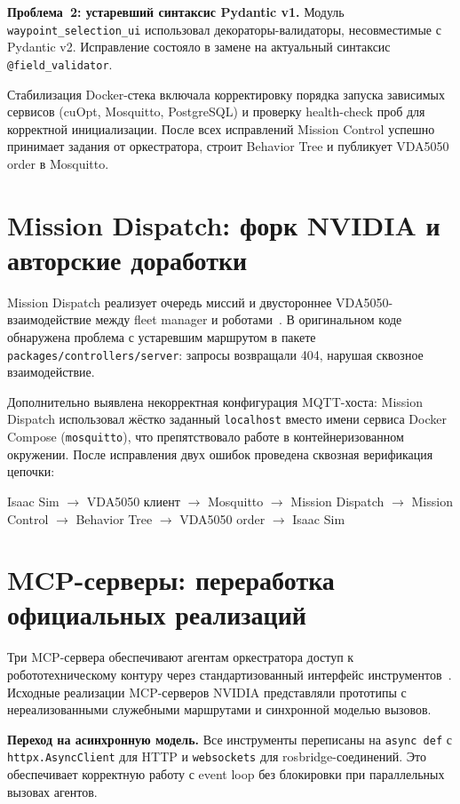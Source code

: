 \documentclass[14pt,a4paper]{extreport}
\begin{document}
\textbf{Проблема~2: устаревший синтаксис Pydantic v1.} Модуль \texttt{waypoint\_selection\_ui} использовал декораторы-валидаторы, несовместимые с Pydantic v2. Исправление состояло в замене на актуальный синтаксис \texttt{@field\_validator}.

Стабилизация Docker-стека включала корректировку порядка запуска зависимых сервисов (cuOpt, Mosquitto, PostgreSQL) и проверку health-check проб для корректной инициализации. После всех исправлений Mission Control успешно принимает задания от оркестратора, строит Behavior Tree и публикует VDA5050 order в Mosquitto.

\section{Mission Dispatch: форк NVIDIA и авторские доработки}

Mission Dispatch реализует очередь миссий и двустороннее VDA5050-взаимодействие между fleet manager и роботами~\cite{missiondispatch}. В оригинальном коде обнаружена проблема с устаревшим маршрутом в пакете \texttt{packages/controllers/server}: запросы возвращали 404, нарушая сквозное взаимодействие.

Дополнительно выявлена некорректная конфигурация MQTT-хоста: Mission Dispatch использовал жёстко заданный \texttt{localhost} вместо имени сервиса Docker Compose (\texttt{mosquitto}), что препятствовало работе в контейнеризованном окружении. После исправления двух ошибок проведена сквозная верификация цепочки:

\begin{center}
Isaac Sim $\to$ VDA5050 клиент $\to$ Mosquitto $\to$ Mission Dispatch $\to$ Mission Control $\to$ Behavior Tree $\to$ VDA5050 order $\to$ Isaac Sim
\end{center}

\section{MCP-серверы: переработка официальных реализаций}

Три MCP-сервера обеспечивают агентам оркестратора доступ к робототехническому контуру через стандартизованный интерфейс инструментов~\cite{mcp2024,fastmcp}. Исходные реализации MCP-серверов NVIDIA представляли прототипы с нереализованными служебными маршрутами и синхронной моделью вызовов.

\textbf{Переход на асинхронную модель.} Все инструменты переписаны на \texttt{async def} с \texttt{httpx.AsyncClient} для HTTP и \texttt{websockets} для rosbridge-соединений. Это обеспечивает корректную работу с event loop без блокировки при параллельных вызовах агентов.
\end{document}
